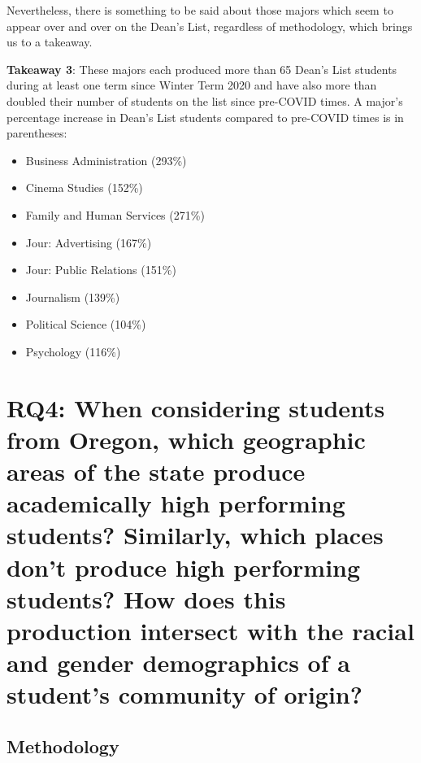 \documentclass[10pt]{article}
\begin{document}
Nevertheless, there is something to be said about those majors which seem to appear over and over on the Dean's List, regardless of methodology, which brings us to a takeaway.


\textbf{Takeaway 3}: These majors each produced more than 65 Dean's List students during at least one term since Winter Term 2020 and have also more than doubled their number of students on the list since pre-COVID times. A major's percentage increase in Dean's List students compared to pre-COVID times is in parentheses: 
\begin{itemize}
	\item Business Administration (293\%)
	\item Cinema Studies (152\%)
	\item Family and Human Services (271\%)
	\item Jour: Advertising (167\%)
	\item Jour: Public Relations (151\%)
	\item Journalism (139\%)
	\item Political Science (104\%)
	\item Psychology (116\%)
\end{itemize}

\section{RQ4: When considering students from Oregon, which geographic areas of the state produce academically high performing students? Similarly, which places don't produce high performing students? How does this production intersect with the racial and gender demographics of a student's community of origin?}

\subsection{Methodology}
\end{document}

